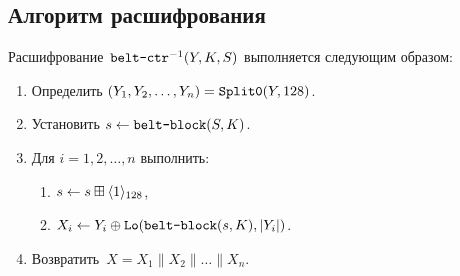 \subsection{Алгоритм расшифрования}\label{CTR.Decr}

Расшифрование~$\texttt{belt-ctr}^{-1}(Y,K,S)$ выполняется следующим образом:
\begin{enumerate}
\item
Определить $(Y_1,Y_2,\ldots,Y_n)=\mathop{\texttt{Split0}}\nolimits(Y,128)$.
\item
Установить 
$s\leftarrow \texttt{belt-block}(S,K)$.
\item
Для $i=1,2,\ldots,n$ выполнить:
\begin{enumerate}
\item
$s\leftarrow s\boxplus\langle1\rangle_{128}$,
\item
$X_i\leftarrow Y_i\oplus\mathop{\texttt{Lo}}\nolimits(\texttt{belt-block}(s,K),|Y_i|)$.
\end{enumerate}
\item
Возвратить~$X=X_1\parallel X_2\parallel\ldots\parallel X_n$.
\end{enumerate}
